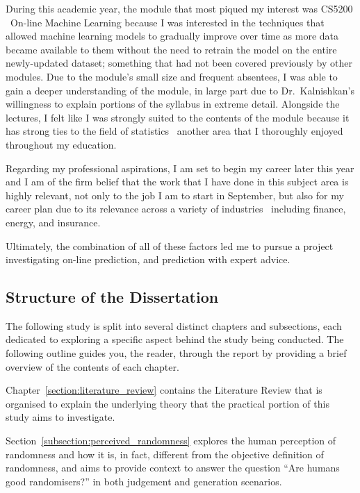 During this academic year, the module that most piqued my interest was CS5200 \textendash\ On-line Machine Learning because I was interested in the techniques that allowed machine learning models to gradually improve over time as more data became available to them without the need to retrain the model on the entire newly-updated dataset; something that had not been covered previously by other modules. Due to the module's small size and frequent absentees, I was able to gain a deeper understanding of the module, in large part due to Dr.\ Kalnishkan's willingness to explain portions of the syllabus in extreme detail. Alongside the lectures, I felt like I was strongly suited to the contents of the module because it has strong ties to the field of statistics \textendash\ another area that I thoroughly enjoyed throughout my education.

Regarding my professional aspirations, I am set to begin my career later this year and I am of the firm belief that the work that I have done in this subject area is highly relevant, not only to the job I am to start in September, but also for my career plan due to its relevance across a variety of industries \textendash\ including finance, energy, and insurance.

Ultimately, the combination of all of these factors led me to pursue a project investigating on-line prediction, and prediction with expert advice.

\subsection{Structure of the Dissertation}
The following study is split into several distinct chapters and subsections, each dedicated to exploring a specific aspect behind the study being conducted. The following outline guides you, the reader, through the report by providing a brief overview of the contents of each chapter.

Chapter~\ref{section:literature_review} contains the Literature Review that is organised to explain the underlying theory that the practical portion of this study aims to investigate.

Section~\ref{subsection:perceived_randomness} explores the human perception of randomness and how it is, in fact, different from the objective definition of randomness, and aims to provide context to answer the question ``Are humans good randomisers?'' in both judgement and generation scenarios.

